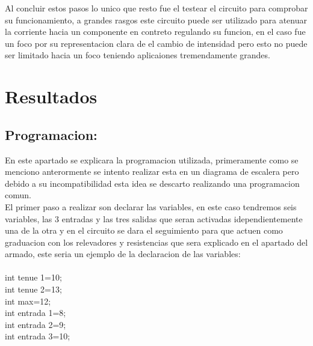 \documentclass[12pt,a4paper]{article}
\begin{document}
Al concluir estos pasos  lo unico que  resto fue el testear el circuito para  comprobar su funcionamiento, a grandes rasgos este circuito puede ser utilizado para atenuar la corriente hacia un componente en contreto regulando su funcion, en el caso fue un foco por su representacion clara de el cambio de intensidad pero esto no puede ser limitado hacia un foco teniendo aplicaiones tremendamente grandes. 

\section{Resultados}
\subsection{Programacion:}

En este apartado se explicara la programacion  utilizada, primeramente como se menciono anterormente  se intento realizar esta en un diagrama de escalera pero debido a su incompatibilidad esta idea se descarto realizando una programacion comun.\\
 El primer paso a realizar son declarar las variables, en este caso tendremos seis variables, las 3 entradas y las tres salidas que seran activadas idependientemente una de la otra y en el circuito se dara el seguimiento para que actuen como graduacion con los relevadores y resistencias que sera explicado en el apartado del armado, este seria un ejemplo de la declaracion de las variables:\\\\
 int tenue 1=10;\\
 int tenue 2=13;\\
 int max=12;\\ 
 
 int entrada 1=8;\\
 int entrada 2=9;\\
 int entrada 3=10;\\
 
\end{document}
